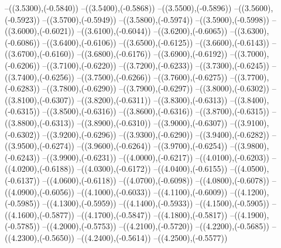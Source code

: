 {	--({\sx*(3.5300)},{\sy*(-0.5840)})
	--({\sx*(3.5400)},{\sy*(-0.5868)})
	--({\sx*(3.5500)},{\sy*(-0.5896)})
	--({\sx*(3.5600)},{\sy*(-0.5923)})
	--({\sx*(3.5700)},{\sy*(-0.5949)})
	--({\sx*(3.5800)},{\sy*(-0.5974)})
	--({\sx*(3.5900)},{\sy*(-0.5998)})
	--({\sx*(3.6000)},{\sy*(-0.6021)})
	--({\sx*(3.6100)},{\sy*(-0.6044)})
	--({\sx*(3.6200)},{\sy*(-0.6065)})
	--({\sx*(3.6300)},{\sy*(-0.6086)})
	--({\sx*(3.6400)},{\sy*(-0.6106)})
	--({\sx*(3.6500)},{\sy*(-0.6125)})
	--({\sx*(3.6600)},{\sy*(-0.6143)})
	--({\sx*(3.6700)},{\sy*(-0.6160)})
	--({\sx*(3.6800)},{\sy*(-0.6176)})
	--({\sx*(3.6900)},{\sy*(-0.6192)})
	--({\sx*(3.7000)},{\sy*(-0.6206)})
	--({\sx*(3.7100)},{\sy*(-0.6220)})
	--({\sx*(3.7200)},{\sy*(-0.6233)})
	--({\sx*(3.7300)},{\sy*(-0.6245)})
	--({\sx*(3.7400)},{\sy*(-0.6256)})
	--({\sx*(3.7500)},{\sy*(-0.6266)})
	--({\sx*(3.7600)},{\sy*(-0.6275)})
	--({\sx*(3.7700)},{\sy*(-0.6283)})
	--({\sx*(3.7800)},{\sy*(-0.6290)})
	--({\sx*(3.7900)},{\sy*(-0.6297)})
	--({\sx*(3.8000)},{\sy*(-0.6302)})
	--({\sx*(3.8100)},{\sy*(-0.6307)})
	--({\sx*(3.8200)},{\sy*(-0.6311)})
	--({\sx*(3.8300)},{\sy*(-0.6313)})
	--({\sx*(3.8400)},{\sy*(-0.6315)})
	--({\sx*(3.8500)},{\sy*(-0.6316)})
	--({\sx*(3.8600)},{\sy*(-0.6316)})
	--({\sx*(3.8700)},{\sy*(-0.6315)})
	--({\sx*(3.8800)},{\sy*(-0.6313)})
	--({\sx*(3.8900)},{\sy*(-0.6310)})
	--({\sx*(3.9000)},{\sy*(-0.6307)})
	--({\sx*(3.9100)},{\sy*(-0.6302)})
	--({\sx*(3.9200)},{\sy*(-0.6296)})
	--({\sx*(3.9300)},{\sy*(-0.6290)})
	--({\sx*(3.9400)},{\sy*(-0.6282)})
	--({\sx*(3.9500)},{\sy*(-0.6274)})
	--({\sx*(3.9600)},{\sy*(-0.6264)})
	--({\sx*(3.9700)},{\sy*(-0.6254)})
	--({\sx*(3.9800)},{\sy*(-0.6243)})
	--({\sx*(3.9900)},{\sy*(-0.6231)})
	--({\sx*(4.0000)},{\sy*(-0.6217)})
	--({\sx*(4.0100)},{\sy*(-0.6203)})
	--({\sx*(4.0200)},{\sy*(-0.6188)})
	--({\sx*(4.0300)},{\sy*(-0.6172)})
	--({\sx*(4.0400)},{\sy*(-0.6155)})
	--({\sx*(4.0500)},{\sy*(-0.6137)})
	--({\sx*(4.0600)},{\sy*(-0.6118)})
	--({\sx*(4.0700)},{\sy*(-0.6098)})
	--({\sx*(4.0800)},{\sy*(-0.6078)})
	--({\sx*(4.0900)},{\sy*(-0.6056)})
	--({\sx*(4.1000)},{\sy*(-0.6033)})
	--({\sx*(4.1100)},{\sy*(-0.6009)})
	--({\sx*(4.1200)},{\sy*(-0.5985)})
	--({\sx*(4.1300)},{\sy*(-0.5959)})
	--({\sx*(4.1400)},{\sy*(-0.5933)})
	--({\sx*(4.1500)},{\sy*(-0.5905)})
	--({\sx*(4.1600)},{\sy*(-0.5877)})
	--({\sx*(4.1700)},{\sy*(-0.5847)})
	--({\sx*(4.1800)},{\sy*(-0.5817)})
	--({\sx*(4.1900)},{\sy*(-0.5785)})
	--({\sx*(4.2000)},{\sy*(-0.5753)})
	--({\sx*(4.2100)},{\sy*(-0.5720)})
	--({\sx*(4.2200)},{\sy*(-0.5685)})
	--({\sx*(4.2300)},{\sy*(-0.5650)})
	--({\sx*(4.2400)},{\sy*(-0.5614)})
	--({\sx*(4.2500)},{\sy*(-0.5577)})
}
